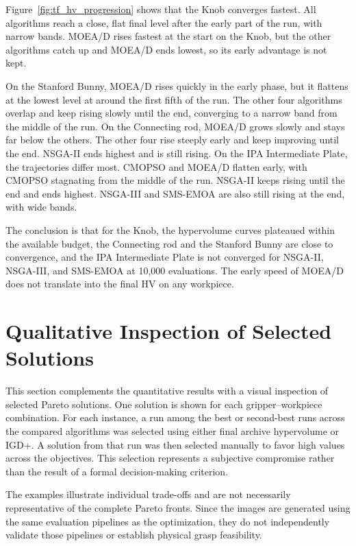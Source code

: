 Figure~\ref{fig:tf_hv_progression} shows that the Knob converges fastest. All algorithms reach a
close, flat final level after the early part of the run, with narrow bands. MOEA/D rises fastest
at the start on the Knob, but the other algorithms catch up and MOEA/D ends lowest, so its early
advantage is not kept.

On the Stanford Bunny, MOEA/D rises quickly in the early phase, but it flattens at the lowest level
at around the first fifth of the run. The other four algorithms overlap and keep rising slowly
until the end, converging to a narrow band from the middle of the run. On the Connecting rod,
MOEA/D grows slowly and stays far below the others. The other four rise steeply early and keep
improving until the end. NSGA-II ends highest and is still rising. On the IPA Intermediate Plate,
the trajectories differ most. CMOPSO and MOEA/D flatten early, with CMOPSO stagnating from the
middle of the run. NSGA-II keeps rising until the end and ends highest. NSGA-III and SMS-EMOA are
also still rising at the end, with wide bands.

The conclusion is that for the Knob, the hypervolume curves plateaued within the
available budget, the Connecting rod and the Stanford Bunny are close to
convergence, and the IPA Intermediate Plate is not converged for NSGA-II,
NSGA-III, and SMS-EMOA at 10,000 evaluations. The early speed of MOEA/D does not
translate into the
final HV on any workpiece.

\section{Qualitative Inspection of Selected Solutions}
\label{sec:qualitative_inspection}

This section complements the quantitative results with a visual
inspection of selected Pareto solutions. One solution is shown for
each gripper--workpiece combination. For each instance, a run among
the best or second-best runs across the compared algorithms was
selected using either final archive hypervolume or IGD+. A solution
from that run was then selected manually to favor high values across
the objectives. This selection represents a subjective compromise
rather than the result of a formal decision-making criterion.

The examples illustrate individual trade-offs and are not necessarily
representative of the complete Pareto fronts. Since the images are
generated using the same evaluation pipelines as the optimization,
they do not independently validate those pipelines or establish
physical grasp feasibility.

